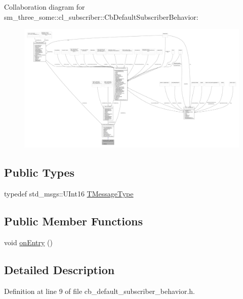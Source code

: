 Collaboration diagram for sm\+\_\+three\+\_\+some\+:\+:cl\+\_\+subscriber\+:\+:Cb\+Default\+Subscriber\+Behavior\+:
\nopagebreak
\begin{figure}[H]
\begin{center}
\leavevmode
\includegraphics[width=350pt]{classsm__three__some_1_1cl__subscriber_1_1CbDefaultSubscriberBehavior__coll__graph}
\end{center}
\end{figure}
\subsection*{Public Types}
\begin{DoxyCompactItemize}
\item 
typedef std\+\_\+msgs\+::\+U\+Int16 \hyperlink{classsm__three__some_1_1cl__subscriber_1_1CbDefaultSubscriberBehavior_a963e1040a9d7d8d49024b4d8f350895d}{T\+Message\+Type}
\end{DoxyCompactItemize}
\subsection*{Public Member Functions}
\begin{DoxyCompactItemize}
\item 
void \hyperlink{classsm__three__some_1_1cl__subscriber_1_1CbDefaultSubscriberBehavior_a9d1f8dfb490a26b1fcdab1b740436837}{on\+Entry} ()
\end{DoxyCompactItemize}


\subsection{Detailed Description}


Definition at line 9 of file cb\+\_\+default\+\_\+subscriber\+\_\+behavior.\+h.



